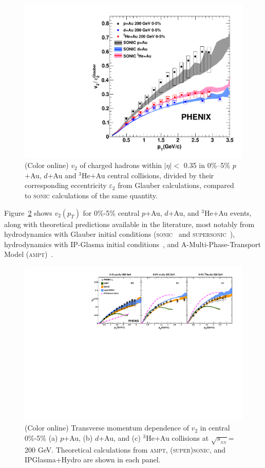 \documentclass[%
reprint,
showpacs,preprintnumbers,
 amsmath,amssymb,
 aps,
]{revtex4-1}
\newcommand{\pt}{\mbox{$p_T$}\xspace}
\newcommand{\sqsn}{\mbox{$\sqrt{s_{_{NN}}}$}\xspace}
\newcommand{\dau}{\mbox{$d$+Au}\xspace}
\newcommand{\pau}{\mbox{$p$+Au}\xspace}
\newcommand{\hau}{\mbox{$^3\text{He}$+Au}\xspace}
\begin{document}
\begin{figure}[htbp]
  \includegraphics[scale=0.45]{Figures/figure4.pdf}
  \caption{(Color online) $v_2$ of charged hadrons within $|\eta| <$ 0.35 in 0\%--5\% \pau, \dau and \hau central collisions, divided by their corresponding eccentricity $\varepsilon_2$ from Glauber calculations, compared to \textsc{sonic} calculations of the same quantity.}
\label{fig:figure4}
\end{figure}

Figure~\ref{fig:figure5} shows $v_2(\pt)$ for 0\%-5\% central \pau, \dau, and \hau events, along with theoretical predictions available in the literature, most notably from hydrodynamics with Glauber initial conditions (\textsc{sonic}~\cite{Habich:2014jna} and \textsc{supersonic}~\cite{Romatschke:2015gxa}), hydrodynamics with IP-Glasma initial conditions~\cite{Schenke:2014gaa}, and A-Multi-Phase-Transport Model (\textsc{ampt})~\cite{lin_multiphase_2005}.

\begin{figure}[htbp]
  \includegraphics[scale=0.9]{Figures/figure5.pdf}
  \caption{(Color online) Transverse momentum dependence of $v_2$ in central 0\%-5\% (a) \pau, (b) \dau, and (c) \hau collisions at \sqsn = 200 GeV. Theoretical calculations from \textsc{ampt}, \textsc{(super)sonic}, and IPGlasma+Hydro are shown in each panel.}
\label{fig:figure5}
\end{figure}
\end{document}
